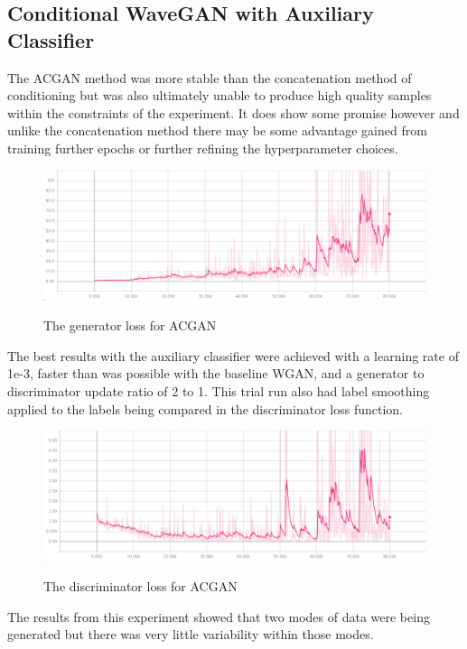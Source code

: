 \documentclass[a4paper, titlepage]{article}
\begin{document}
\subsection{Conditional WaveGAN with Auxiliary Classifier}

The \ac{ACGAN} method was more stable than the concatenation method of conditioning but was also ultimately unable to produce high quality samples within the constraints of the experiment.
It does show some promise however and unlike the concatenation method there may be some advantage gained from training further epochs or further refining the hyperparameter choices.
\newline
%
\begin{figure}[ht]%
  \caption{The generator loss for ACGAN}
  \centering
  \includegraphics[width=1\textwidth, clip]{ACGAN-Gen-Loss}
  \label{fig:ACGAN-Gen-Loss}%
\end{figure}
%
\newline
The best results with the auxiliary classifier were achieved with a learning rate of 1e-3, faster than was possible with the baseline WGAN, and a generator to discriminator update ratio of 2 to 1.
This trial run also had label smoothing applied to the labels being compared in the discriminator loss function.
\newline
%
\begin{figure}[ht]%
  \caption{The discriminator loss for ACGAN}
  \centering
  \includegraphics[width=1\textwidth, clip]{ACGAN-Dis-Loss}
  \label{fig:ACGAN-Dis-Loss}%
\end{figure}
%
\newline
The results from this experiment showed that two modes of data were being generated but there was very little variability within those modes.
\end{document}
